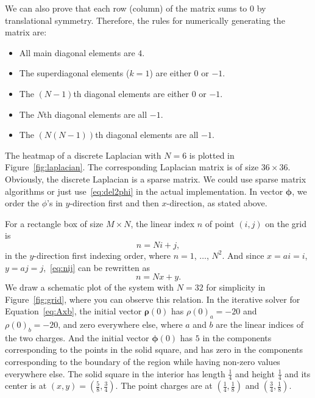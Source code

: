 We can also prove that each row (column) of the matrix sums to \(0\) by
translational symmetry. Therefore, the rules for numerically generating
the matrix are\footnotemark{}:
%
\begin{itemize}
    \item All main diagonal elements are \(4\).
    \item The superdiagonal elements (\(k = 1\)) are either \(0\) or \(-1\).
    \item The \((N-1)\)th diagonal elements are either \(0\) or \(-1\).
    \item The \(N\)th diagonal elements are all \(-1\).
    \item The \((N(N - 1))\)th diagonal elements are all \(-1\).
\end{itemize}
%

The heatmap of a discrete Laplacian with \(N = 6\) is plotted in Figure~\ref{fig:laplacian}.
The corresponding Laplacian matrix is of size \(36 \times 36\).
Obviously, the discrete Laplacian is a sparse matrix.
We could use sparse matrix algorithms or just use~\eqref{eq:del2phi} in the actual
implementation.
In vector \(\bm{\phi}\), we order the \(\phi\)'s in \(y\)-direction first and then
\(x\)-direction, as stated above.

For a rectangle box of size \(M \times N\), the linear index \(n\) of point \((i, j)\)
on the grid is
%
\begin{equation}\label{eq:nij}
    n = N i + j,
\end{equation}
%
in the \(y\)-direction first indexing order, where \(n = 1\), \(\ldots\), \(N^2\).
And since \(x = a i = i\), \(y = a j = j\),~\eqref{eq:nij} can be rewritten as
%
\begin{equation}
    n = N x + y.
\end{equation}
%
We draw a schematic plot of the system with \(N = 32\) for simplicity in
Figure~\ref{fig:grid}, where you can observe this relation.
In the iterative solver for Equation~\ref{eq:Axb},
the initial vector \(\bm{\rho}(0)\) has \(\rho(0)_a = -20\) and \(\rho(0)_b = -20\),
and zero everywhere else,
where \(a\) and \(b\) are the linear indices of the two charges.
And the initial vector \(\bm{\phi}(0)\) has \(5\) in the components corresponding to
the points in the solid square, and has zero in the components corresponding to
the boundary of the region while having non-zero values everywhere else.
The solid square in the interior has length \(\frac{1}{4}\) and height \(\frac{1}{4}\) and
its center is at \((x, y) = (\frac{5}{8}, \frac{3}{4})\).
The point charges are at \((\frac{1}{4}, \frac{1}{8})\) and \((\frac{3}{4}, \frac{1}{8})\).
